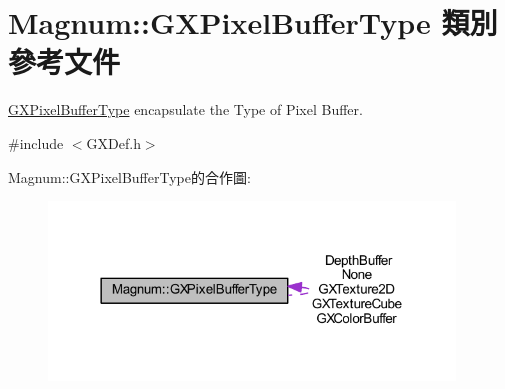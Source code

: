 \hypertarget{class_magnum_1_1_g_x_pixel_buffer_type}{}\section{Magnum\+:\+:G\+X\+Pixel\+Buffer\+Type 類別 參考文件}
\label{class_magnum_1_1_g_x_pixel_buffer_type}


\hyperlink{class_magnum_1_1_g_x_pixel_buffer_type}{G\+X\+Pixel\+Buffer\+Type} encapsulate the Type of Pixel Buffer.  




{\ttfamily \#include $<$G\+X\+Def.\+h$>$}



Magnum\+:\+:G\+X\+Pixel\+Buffer\+Type的合作圖\+:\nopagebreak
\begin{figure}[H]
\begin{center}
\leavevmode
\includegraphics[width=306pt]{class_magnum_1_1_g_x_pixel_buffer_type__coll__graph}
\end{center}
\end{figure}
